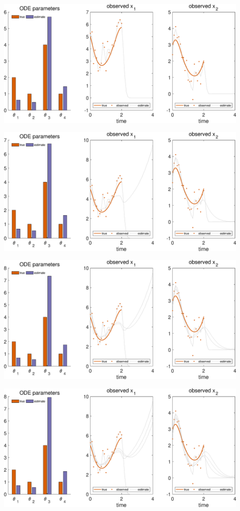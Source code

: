 {\centering
\includegraphics [width=5in]{VGM_for_Lotka_Volterra_02.eps}

\includegraphics [width=5in]{VGM_for_Lotka_Volterra_03.eps}

\includegraphics [width=5in]{VGM_for_Lotka_Volterra_04.eps}

\includegraphics [width=5in]{VGM_for_Lotka_Volterra_05.eps}

}
